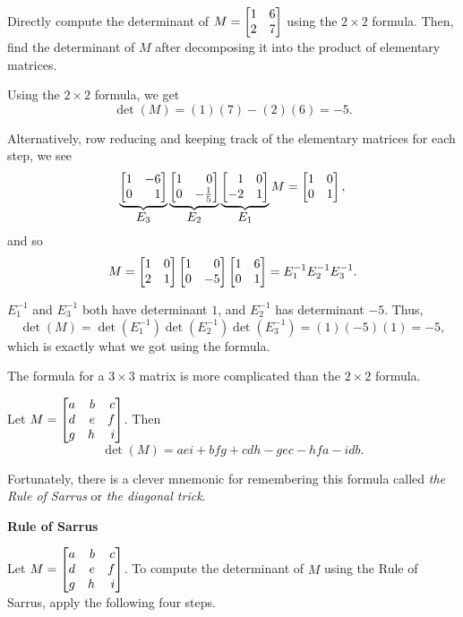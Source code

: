 \begin{example}
	Directly compute the determinant of $M=\mat{1 & 6 \\ 2 & 7}$ using the $2\times 2$ formula.
	Then, find the determinant of $M$ after decomposing it into the product of elementary matrices.

	Using the $2\times 2$ formula, we get
	\[
		\det(M)=(1)(7)-(2)(6)=-5.
	\]

	Alternatively, row reducing and keeping track of the elementary matrices for each step, we see
	\[
		\underbrace{\mat{1 & -6 \\ 0 & 1}}_{\textstyle E_3}
		\underbrace{\mat{1 & 0 \\ 0 & -\frac{1}{5}}}_{\textstyle E_2}
		\underbrace{\mat{1 & 0 \\ -2 & 1}}_{\textstyle E_1} M = \mat{1&0\\0&1},
	\]
	and so
	\[
		M = \mat{1 & 0 \\ 2 & 1}
		    \mat{1 & 0 \\ 0 & -5}
		    \mat{1 & 6 \\ 0 & 1} = E_1^{-1} E_2^{-1} E_3^{-1}.
	\]

	$E_1^{-1}$ and $E_3^{-1}$ both have determinant $1$, and $E_2^{-1}$ has determinant $-5$. Thus,
	\[
		\det(M)=\det(E_1^{-1})\det(E_2^{-1})\det(E_3^{-1})=(1)(-5)(1)=-5,
	\]
	which is exactly what we got using the formula.
\end{example}


The formula for a $3\times 3$ matrix is more complicated than the $2\times 2$ formula.

\begin{theorem}
	 Let
	$M=\mat{a & b & c \\ d & e & f \\ g & h & i}$. Then
	\[
		\det(M)=aei+bfg+cdh-gec-hfa-idb.
	\]
\end{theorem}

Fortunately, there is a clever mnemonic for remembering this formula called \emph{the Rule of Sarrus} or
\emph{the diagonal trick}.

\medskip
{\bfseries Rule of Sarrus}

Let $M=\mat{a & b & c \\ d & e & f \\ g & h & i}$. To compute the determinant of $M$ using the Rule of Sarrus,
apply the following four steps.

